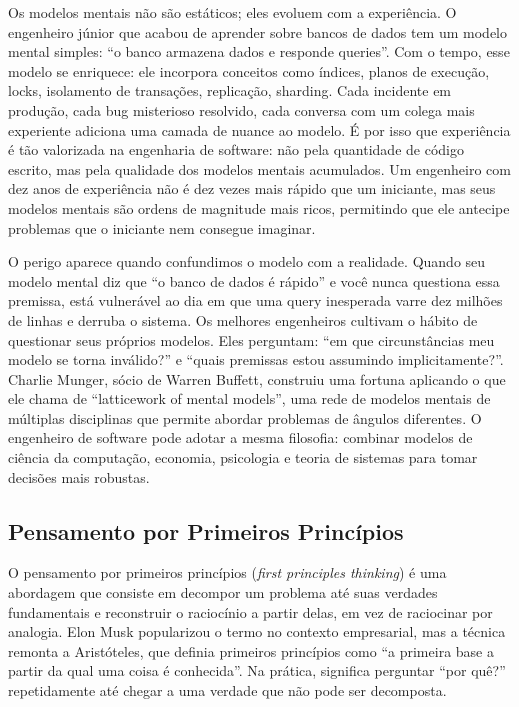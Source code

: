Os modelos mentais não são estáticos; eles evoluem com a experiência.
O engenheiro júnior que acabou de aprender sobre bancos de dados tem um
modelo mental simples: ``o banco armazena dados e responde queries''.
Com o tempo, esse modelo se enriquece: ele incorpora conceitos como
índices, planos de execução, locks, isolamento de transações, replicação,
sharding. Cada incidente em produção, cada bug misterioso resolvido,
cada conversa com um colega mais experiente adiciona uma camada de nuance
ao modelo. É por isso que experiência é tão valorizada na engenharia de
software: não pela quantidade de código escrito, mas pela qualidade dos
modelos mentais acumulados. Um engenheiro com dez anos de experiência
não é dez vezes mais rápido que um iniciante, mas seus modelos mentais
são ordens de magnitude mais ricos, permitindo que ele antecipe problemas
que o iniciante nem consegue imaginar.

O perigo aparece quando confundimos o modelo com a realidade. Quando seu
modelo mental diz que ``o banco de dados é rápido'' e você nunca questiona
essa premissa, está vulnerável ao dia em que uma query inesperada varre
dez milhões de linhas e derruba o sistema. Os melhores engenheiros
cultivam o hábito de questionar seus próprios modelos. Eles perguntam:
``em que circunstâncias meu modelo se torna inválido?'' e ``quais
premissas estou assumindo implicitamente?''. Charlie Munger, sócio de
Warren Buffett, construiu uma fortuna aplicando o que ele chama de
``latticework of mental models'', uma rede de modelos mentais de
múltiplas disciplinas que permite abordar problemas de ângulos diferentes.
O engenheiro de software pode adotar a mesma filosofia: combinar modelos
de ciência da computação, economia, psicologia e teoria de sistemas para
tomar decisões mais robustas.

\subsection{Pensamento por Primeiros Princípios}

O pensamento por primeiros princípios (\emph{first principles thinking})
é uma abordagem que consiste em decompor um problema até suas verdades
fundamentais e reconstruir o raciocínio a partir delas, em vez de
raciocinar por analogia. Elon Musk popularizou o termo no contexto
empresarial, mas a técnica remonta a Aristóteles, que definia primeiros
princípios como ``a primeira base a partir da qual uma coisa é conhecida''.
Na prática, significa perguntar ``por quê?'' repetidamente até chegar a
uma verdade que não pode ser decomposta.

